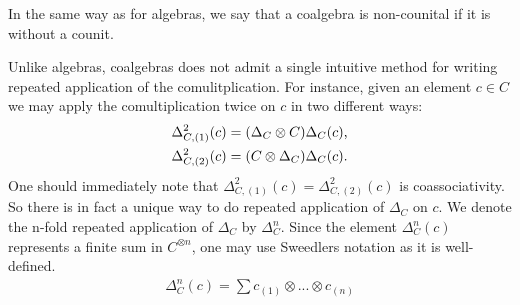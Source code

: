\documentclass[../thesis.tex]{subfiles}
\begin{document}
            In the same way as for algebras, we say that a coalgebra is non-counital if it is without a counit.

            Unlike algebras, coalgebras does not admit a single intuitive method for writing repeated application of the comulitplication. For instance, given an element $c\in C$ we may apply the comultiplication twice on $c$ in two different ways:
            \begin{align*}
                \Delta_{C,(1)}^2(c) & = (\Delta_C \otimes C)\Delta_C(c)\tt{,} \\
                \Delta_{C,(2)}^2(c) & = (C \otimes \Delta_C)\Delta_C(c)\tt{.}
            \end{align*}
            One should immediately note that $\Delta_{C,(1)}^2(c) = \Delta_{C,(2)}^2(c)$ is coassociativity. So there is in fact a unique way to do repeated application of $\Delta_C$ on $c$. We denote the n-fold repeated application of $\Delta_C$ by $\Delta_C^n$. Since the element $\Delta_C^n(c)$ represents a finite sum in $C^{\otimes n}$, one may use Sweedlers notation \cite{Loday12} as it is well-defined.
            \begin{align*}
                \Delta_C^n(c) = \sum c_{(1)}\otimes ... \otimes c_{(n)}
            \end{align*}
            
                    



\end{document}
